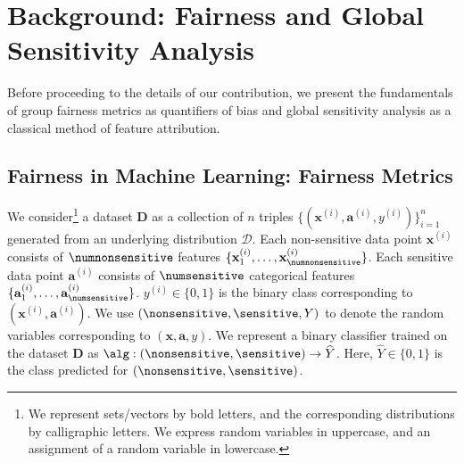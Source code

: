\section{Background: Fairness and Global Sensitivity Analysis}\label{sec:preliminaries}\vspace*{-.5em}
Before proceeding to the details of our contribution, we present the fundamentals of group fairness metrics as quantifiers of bias and global sensitivity analysis as a classical method of feature attribution.\vspace*{-.5em}
\subsection{Fairness in Machine Learning: Fairness Metrics}
We consider\footnote{{We represent sets/vectors by bold letters, and the corresponding distributions by calligraphic letters. We express random variables in uppercase, and an assignment of a random variable in lowercase.}} a dataset $ \mathbf{D} $ as a collection of $n$ triples  $\{(\mathbf{x}^{(i)}, \mathbf{a}^{(i)}, y^{(i)})\}_{i=1}^n$ generated from an underlying distribution $\mathcal{D}$. Each non-sensitive data point $\mathbf{x}^{(i)}$ consists of $\numnonsensitive$ features $\{\mathbf{x}^{(i)}_1, \dots, \mathbf{x}^{(i)}_{\numnonsensitive}\} $. Each sensitive data point $\mathbf{a}^{(i)}$ consists of $\numsensitive$ categorical features $\{\mathbf{a}^{(i)}_1, \dots, \mathbf{a}^{(i)}_{\numsensitive}\} $.  $y^{(i)} \in \{0,1\}$ is the binary class corresponding to $(\mathbf{x}^{(i)}, \mathbf{a}^{(i)})$. %
 We use $ (\nonsensitive, \sensitive, Y) $ to denote the random variables corresponding to $ (\mathbf{x}, \mathbf{a}, y)$.  
 We represent a binary classifier trained on the dataset $\mathbf{D}$ as $\alg: (\nonsensitive, \sensitive) \rightarrow \widehat{Y} $. Here, $\widehat{Y} \in \{0,1\}$ is the class predicted for $ (\nonsensitive, \sensitive) $.
